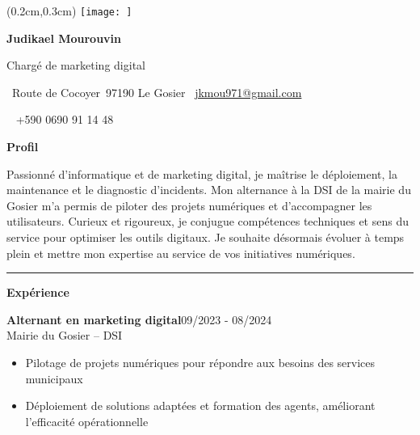 \documentclass[a4paper]{article}
\renewcommand{\colorbox}[2]{#2}%
\newcommand{\fullrule}{\hspace{-1.5cm}\rule{\paperwidth}{0.4pt}}
\newcommand{\cvsection}[1]{%
  \vspace{6pt}\textbf{\Large #1}\par\vspace{2pt}}
\begin{document}
\color{white}
\ifx\relax\relax\else
\begin{textblock*}{4cm}(0.2cm,0.3cm)
  \texttt{[image: ]}
\end{textblock*}
 \fi
\begin{center}
  {\fontsize{44pt}{24pt}\selectfont\bfseries Judikael Mourouvin}

  \bigskip
  {\Large Chargé de marketing digital}

  \bigskip\bigskip
  \faMapMarker~Route de Cocoyer\ 97190 Le Gosier
  \quad\faEnvelope~\href{mailto:jkmou971@gmail.com}{jkmou971@gmail.com}

  \bigskip
  \faPhone~ +590 0690 91 14 48
  \quad \faLinkedin\ \href{}{}
 

  \vspace{-0.3cm}
  
\end{center}
\cvsection{Profil}

Passionné d’informatique et de marketing digital, je maîtrise le déploiement, la maintenance et le diagnostic d’incidents. Mon alternance à la DSI de la mairie du Gosier m’a permis de piloter des projets numériques et d’accompagner les utilisateurs. Curieux et rigoureux, je conjugue compétences techniques et sens du service pour optimiser les outils digitaux. Je souhaite désormais évoluer à temps plein et mettre mon expertise au service de vos initiatives numériques.

\medskip\fullrule

\cvsection{Expérience}
\colorbox{maincolor}{%
  \begin{minipage}{\linewidth}
    \noindent
    \textbf{Alternant en marketing digital}\hfill 09/2023 - 08/2024\\
    Mairie du Gosier – DSI\\[-0.3em]
    \begin{itemize}[leftmargin=*]
      \item Pilotage de projets numériques pour répondre aux besoins des services municipaux \item Déploiement de solutions adaptées et formation des agents, améliorant l’efficacité opérationnelle
    \end{itemize}
  \end{minipage}}
\end{document}
